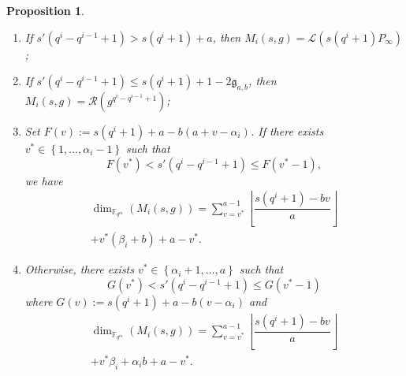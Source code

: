 \documentclass[lettersize,journal]{IEEEtran}
\theoremstyle{plain}
\newtheorem{proposition}[thm]{Proposition}
\theoremstyle{definition}
\theoremstyle{remark}
\newcommand{\calL}{\mathcal{L}}
\newcommand{\calR}{\mathcal{R}}
\newcommand{\fqm}{\mathbb{F}_{q^m}}
\newcommand{\set}[1]{\left\{#1\right\}}
\begin{document}
	\begin{proposition} \label{prop:dim_M_i's}
		\begin{enumerate}
			\item If $s'(q^i-q^{i-1}+1) > s(q^i+1)+a$, then $M_i(s,g) = \calL(s(q^i+1)P_\infty)$;
			
			\item If $s'(q^i-q^{i-1}+1) \leq s(q^i+1)+1-2\mathfrak{g}_{a,b}$, then $M_i(s,g) = \calR(g^{q^{i}-q^{i-1}+1})$;
			
			\item Set $F(v) := s(q^i+1)+a-b(a+v-\alpha_i)$. If there exists $v^* \in \set{1,\dots,\alpha_i-1}$ such that
			$$ F(v^*) < s'(q^i-q^{i-1}+1) \leq  F(v^*-1),$$
			we have 
			\begin{multline*}
			\dim_{\fqm}(M_i(s,g)) = \sum\limits_{v=v^*}^{a-1} \left\lfloor \dfrac{s(q^i+1)-bv}{a} \right\rfloor\\ + v^*(\beta_i+b) + a-v^*.
			\end{multline*}
			
			\item Otherwise, there exists $v^* \in \set{\alpha_i+1,\dots,a}$ such that
			$$ G(v^*) < s'(q^i-q^{i-1}+1) \leq  G(v^*-1)$$
			where $G(v) := s(q^i+1)+a-b(v-\alpha_i)$ and
			\begin{multline*}
			\dim_{\fqm}(M_i(s,g)) = \sum\limits_{v=v^*}^{a-1} \left\lfloor \dfrac{s(q^i+1)-bv}{a} \right\rfloor\\ + v^*\beta_i + \alpha_ib +a-v^*.
			\end{multline*}				
		\end{enumerate}
	\end{proposition}
	
\end{document}
